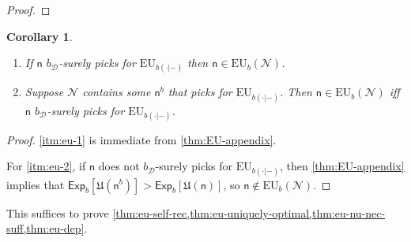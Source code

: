\documentclass[a4paper]{article}
\newtheorem{corollary}[theorem]{Corollary}
\newcommand\Exp{\mathsf{Exp}}
\newcommand\EU{\mathrm{EU}}
\newcommand\U{\mathfrak{U}} %
\newcommand{\D}{\mathcal{D}}
\newcommand{\Decs}{\mathcal{D}}
\newcommand{\n}{\mathsf{n}}
\renewcommand{\nu}{\n}
\newcommand\Nu{\mathcal{N}}
\renewcommand{\leq}{\leqslant}
\newenvironment{CCM rewritten}
{\begingroup\color{blue}} %
{\endgroup}              %
\begin{document}
\begin{proof}
%
%
%
\end{proof}
\begin{corollary}\label{thm:EU-appendix corollary}
	\begin{enumerate}[label=\normalfont(\roman*), ref=(\roman*)]
		\item\label{itm:eu-1} If $\nu$ $b_\Decs$-surely picks for $\EU_{b(\cdot|-)}$ then $\nu\in\EU_b(\Nu)$.
		\item \label{itm:eu-2}Suppose $\Nu$ contains some $\nu^b$ that picks for $\EU_{b(\cdot|-)}$.  Then $\nu\in\EU_b(\Nu)$ iff $\nu$ $b_\Decs$-surely picks for $\EU_{b(\cdot|-)}$.
	\end{enumerate}
\end{corollary}
\begin{proof}
	\ref{itm:eu-1} is immediate from \cref{thm:EU-appendix}. 
	
	For \ref{itm:eu-2}, if $\nu$ does not $b_\Decs$-surely picks for $\EU_{b(\cdot|-)}$, then \cref{thm:EU-appendix} implies that $\Exp_b[\U(\nu^b)]>\Exp_b[\U(\nu)]$, so $\nu\notin\EU_b(\Nu)$. 
\end{proof}

This suffices to prove \cref{thm:eu-self-rec,thm:eu-uniquely-optimal,thm:eu-nu-nec-suff,thm:eu-dep}.

\end{document}
